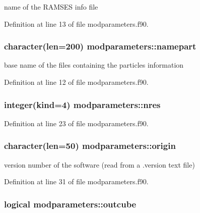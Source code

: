 name of the R\-A\-M\-S\-E\-S info file 



Definition at line 13 of file modparameters.\-f90.

\hypertarget{classmodparameters_a2c7cfce7809c8ff9dc10ab6db6d99cc0}{
\subsubsection[{namepart}]{\setlength{\rightskip}{0pt plus 5cm}character(len=200) modparameters\-::namepart}}\label{classmodparameters_a2c7cfce7809c8ff9dc10ab6db6d99cc0}


base name of the files containing the particles information 



Definition at line 12 of file modparameters.\-f90.

\hypertarget{classmodparameters_af1cb485d0a4ab3c8e0c54b81973aff9a}{
\subsubsection[{nres}]{\setlength{\rightskip}{0pt plus 5cm}integer(kind=4) modparameters\-::nres}}\label{classmodparameters_af1cb485d0a4ab3c8e0c54b81973aff9a}


Definition at line 23 of file modparameters.\-f90.

\hypertarget{classmodparameters_a912b8c25f0bccd646bbc63f8ecc2b052}{
\subsubsection[{origin}]{\setlength{\rightskip}{0pt plus 5cm}character(len=50) modparameters\-::origin}}\label{classmodparameters_a912b8c25f0bccd646bbc63f8ecc2b052}


version number of the software (read from a .version text file) 



Definition at line 31 of file modparameters.\-f90.

\hypertarget{classmodparameters_ad796cf0d67c6d8c47ce651fe7ec0f967}{
\subsubsection[{outcube}]{\setlength{\rightskip}{0pt plus 5cm}logical modparameters\-::outcube}}\label{classmodparameters_ad796cf0d67c6d8c47ce651fe7ec0f967}


